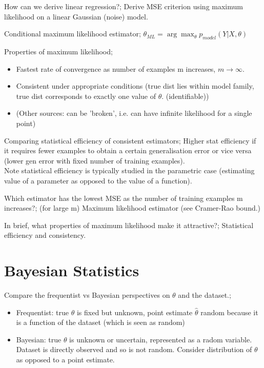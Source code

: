 \documentclass{article}
\begin{document}
How can we derive linear regression?; Derive MSE criterion using maximum likelihood on a linear Gaussian (noise) model.

Conditional maximum likelihood estimator; $\theta_{ML} = \arg\max_{\theta} p_{model}(Y | X,\theta)$

Properties of maximum likelihood; \begin{itemize} \item Fastest rate of convergence as number of examples m increases, $m\to\infty$.  \item Consistent under appropriate conditions (true dist lies within model family, true dist corresponds to exactly one value of $\theta$. (identifiable)) \item (Other sources: can be 'broken', i.e. can have infinite likelihood for a single point) \end{itemize}

Comparing statistical efficiency of consistent estimators; Higher stat efficiency if it requires fewer examples to obtain a certain generalisation error or vice versa (lower gen error with fixed number of training examples). \\ Note statistical efficiency is typically studied in the parametric case (estimating value of a parameter as opposed to the value of a function).

Which estimator has the lowest MSE as the number of training examples m increases?; (for large m) Maximum likelihood estimator (see Cramer-Rao bound.)

In brief, what properties of maximum likelihood make it attractive?; Statistical efficiency and consistency.

\section{Bayesian Statistics}

Compare the frequentist vs Bayesian perspectives on $\theta$ and the dataset.; \begin{itemize} \item Frequentist: true $\theta$ is fixed but unknown, point estimate $\hat{\theta}$ random because it is a function of the dataset (which is seen as random) \item Bayesian: true $\theta$ is unknown or uncertain, represented as a radom variable. Dataset is directly observed and so is not random. Consider distribution of $\theta$ as opposed to a point estimate.  \end{itemize} 
\end{document}
